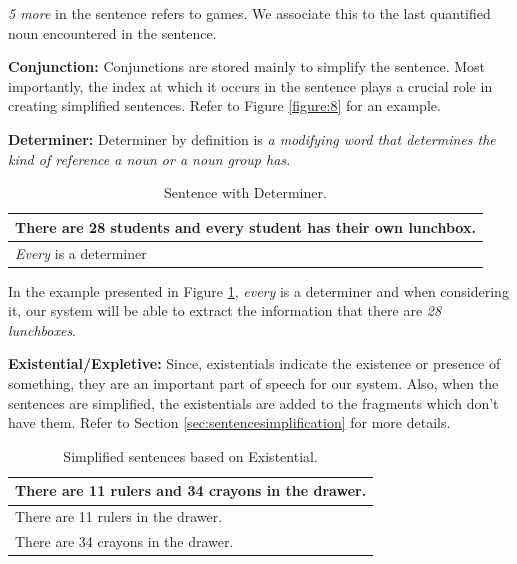\documentclass[11pt]{article}
\begin{document}
\textit{5 more} in the sentence refers to games. We associate this to the last quantified noun encountered in the sentence.
\vspace{4mm}

\newpage

\textbf{Conjunction:} Conjunctions are stored mainly to simplify the sentence. Most importantly, the index at which it occurs in the sentence plays a crucial role in creating simplified sentences. Refer to Figure \ref{figure:8} for an example.
\vspace{4mm}

\textbf{Determiner:} Determiner by definition is \textit{a modifying word that determines the kind of reference a noun or a noun group has.} 

\begin{table}[h!]
\centering
\begin{tabular}{ | m{25em} | }
\hline
\textbf{There are 28 students and every student has their own lunchbox.}\\
\hline
\textit{Every} is a determiner\\
\hline
\end{tabular}
\caption{Sentence with Determiner.}
\label{figure:4}
\end{table}

In the example presented in Figure \ref{figure:4}, \textit{every} is a determiner and when considering it, our system will be able to extract the information that there are \textit{28 lunchboxes}.
\vspace{4mm}

\textbf{Existential/Expletive:} Since, existentials indicate the existence or presence of something, they are an important part of speech for our system. Also, when the sentences are simplified, the existentials are added to the fragments which don't have them. Refer to Section \ref{sec:sentencesimplification} for more details.

\begin{table}[h!]
\centering
\begin{tabular}{ | m{25em} | }
\hline
\textbf{There are 11 rulers and 34 crayons in the drawer.}\\
\hline
There are 11 rulers in the drawer.\\
\hline
There are 34 crayons in the drawer.\\
\hline
\end{tabular}
\caption{Simplified sentences based on Existential.}
\label{figure:5}
\end{table}
\end{document}
